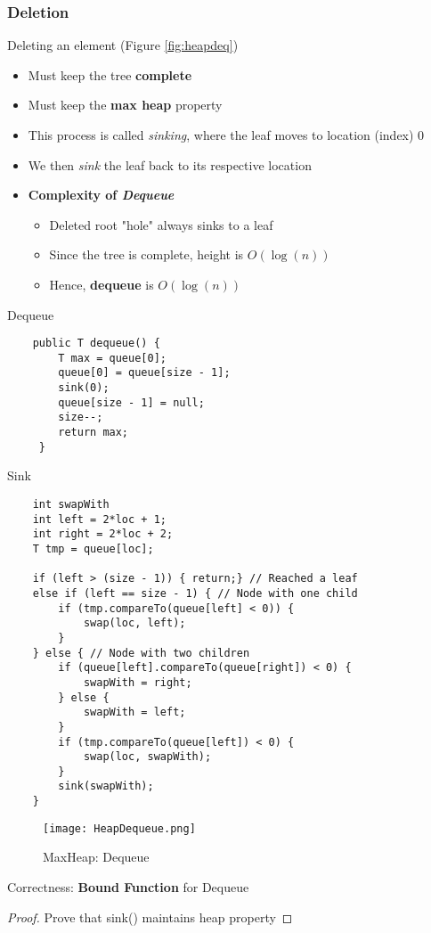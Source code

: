\documentclass[10pt, 
a4paper, 
oneside, 
headinclude, footinclude, 
BCOR5mm]
{scrartcl}
\begin{document}
\subsubsection{Deletion}
\begin{definition}
    Deleting an element (Figure \vref{fig:heapdeq})
    \begin{itemize}
        \item Must keep the tree \textbf{complete}
        \item Must keep the \textbf{max heap} property 
        \item This process is called \textit{sinking}, where the leaf moves to location (index) 0
        \item We then \textit{sink} the leaf back to its respective location
        \item \textbf{Complexity of \textit{Dequeue}}
        \begin{itemize}
            \item Deleted root "hole" always sinks to a leaf
            \item Since the tree is complete, height is $O(\log(n))$
            \item Hence, \textbf{dequeue} is $O(\log(n))$
        \end{itemize}
    \end{itemize}
\end{definition}
Dequeue
\begin{lstlisting}
    public T dequeue() {
        T max = queue[0];
        queue[0] = queue[size - 1];
        sink(0);
        queue[size - 1] = null;
        size--;
        return max;
     }
\end{lstlisting}
Sink
\begin{lstlisting}
    int swapWith
    int left = 2*loc + 1;
    int right = 2*loc + 2;
    T tmp = queue[loc];

    if (left > (size - 1)) { return;} // Reached a leaf
    else if (left == size - 1) { // Node with one child
        if (tmp.compareTo(queue[left] < 0)) {
            swap(loc, left);
        }
    } else { // Node with two children
        if (queue[left].compareTo(queue[right]) < 0) {
            swapWith = right;
        } else {
            swapWith = left;
        } 
        if (tmp.compareTo(queue[left]) < 0) {
            swap(loc, swapWith);
        }
        sink(swapWith);
    }
\end{lstlisting}
\begin{figure}[H]
    \begin{center}
        \texttt{[image: HeapDequeue.png]}
        \caption{MaxHeap: Dequeue}
        \label{fig:heapdeq}
    \end{center}
\end{figure}
Correctness: \textbf{Bound Function} for Dequeue
\begin{proof}
    Prove that sink() maintains heap property
\end{proof}
\newpage
\end{document}
